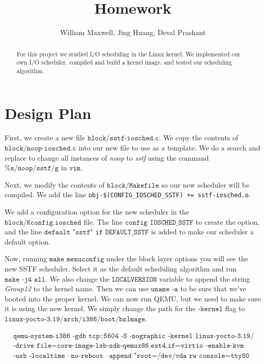 \documentclass[letterpaper,10pt,titlepage]{article}
\title{Homework }
\author{William Maxwell, Jing Huang, Deval Prashant}
\begin{document}
\begin{minipage}[h]{\textwidth}
\maketitle
\begin{abstract}
For this project we studied I/O scheduling in the Linux kernel. We implemented our own I/O scheduler, compiled and build a kernel image, and tested our scheduling algorithm.
\end{abstract}
\end{minipage}
\clearpage
\section{Design Plan}
First, we create a new file $\texttt{block/sstf-iosched.c}$.
We copy the contents of $\texttt{block/noop-iosched.c}$ into our new file to use as a template.
We do a search and replace to change all instances of \textit{noop} to \textit{sstf} using the command $\texttt{\%s/noop/sstf/g}$ in $\texttt{vim}$.

Next, we modify the contents of $\texttt{block/Makefile}$ so our new scheduler will be compiled. We add the line \texttt{obj-\$(CONFIG\_IOSCHED\_SSTF) += sstf-iosched.o}.

We add a configuration option for the new scheduler in the $\texttt{block/Kconfig.iosched}$ file. The line $\texttt{config IOSCHED\_SSTF}$ to create the option, and the line $\texttt{default "sstf" if DEFAULT\_SSTF}$ is added to make our scheduler a default option.

Now, running $\texttt{make menuconfig}$ under the block layer options you will see the new SSTF scheduler. Select it as the default scheduling algorithm and run $\texttt{make -j4 all}$.
We also change the $\texttt{LOCALVERSION}$ variable to append the string \textit{Group12} to the kernel name. Then we can use $\texttt{uname -a}$ to be sure that we've booted into the proper kernel.
We can now run QEMU, but we need to make sure it is using the new kernel. We simply change the path for the $\texttt{-kernel}$ flag to $\texttt{linux-yocto-3.19/arch/i386/boot/bzImage}$.

\begin{align*}
&\texttt{qemu-system-i386 -gdb tcp::5604 -S -nographic -kernel linux-yocto-3.19/arch/i386/boot/bzImage}\\
&\texttt{-drive file=core-image-lsb-sdk-qemux86.ext4,if=virtio -enable-kvm -net none}\\
&\texttt{-usb -localtime --no-reboot --append "root=/dev/vda rw console=ttyS0 debug"}
\end{align*}
\end{document}
